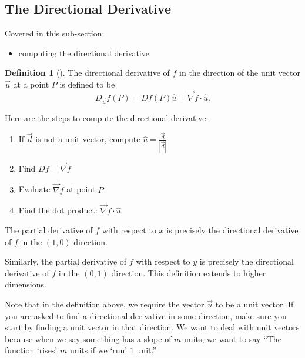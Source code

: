 \documentclass[10pt,]{book}
\theoremstyle{plain}
\theoremstyle{definition}
\newtheorem{definition}[theorem]{Definition}
\theoremstyle{definition}
\theoremstyle{definition}
\theoremstyle{definition}
\theoremstyle{definition}
\numberwithin{equation}{section}
\begin{document}
\subsection[{The Directional Derivative}]{The Directional Derivative}\label{subsection-58}
Covered in this sub-section: \leavevmode%
\begin{itemize}[label=\textbullet]
\item{}computing the directional derivative%
\end{itemize}
%
\begin{definition}[{}]\label{definition-38}
The directional derivative of \(f\) in the direction of the unit vector \(\vec u\) at a point \(P\) is defined to be%
\begin{equation*}
D_{\vec u} f(P) = Df(P) \hat u = \vec \nabla f \cdot \hat u.
\end{equation*}
%
\par
Here are the steps to compute the directional derivative: \leavevmode%
\begin{enumerate}
\item\hypertarget{li-174}{}If \(\vec{d}\) is not a unit vector, compute \(\hat{u}=\frac{\vec{d}}{|\vec{d}|}\)%
\item\hypertarget{li-175}{}Find \(Df=\vec{\nabla} f\)%
\item\hypertarget{li-176}{}Evaluate \(\vec{\nabla} f\) at point \(P\)%
\item\hypertarget{li-177}{}Find the dot product:  \(\vec \nabla f \cdot \hat u\)%
\end{enumerate}
%
\par
The partial derivative of \(f\) with respect to \(x\) is precisely the directional derivative of \(f\) in the \((1,0)\) direction.%
\par
Similarly, the partial derivative of \(f\) with respect to \(y\) is precisely the directional derivative of \(f\) in the \((0,1)\) direction. This definition extends to higher dimensions.%
\end{definition}
Note that in the definition above, we require the vector \(\vec u\) to be a unit vector. If you are asked to find a directional derivative in some direction, make sure you start by finding a unit vector in that direction. We want to deal with unit vectors because when we say something has a slope of \(m\) units, we want to say ``The function `rises' \(m\) units if we `run' \(1\) unit.''%
\end{document}
